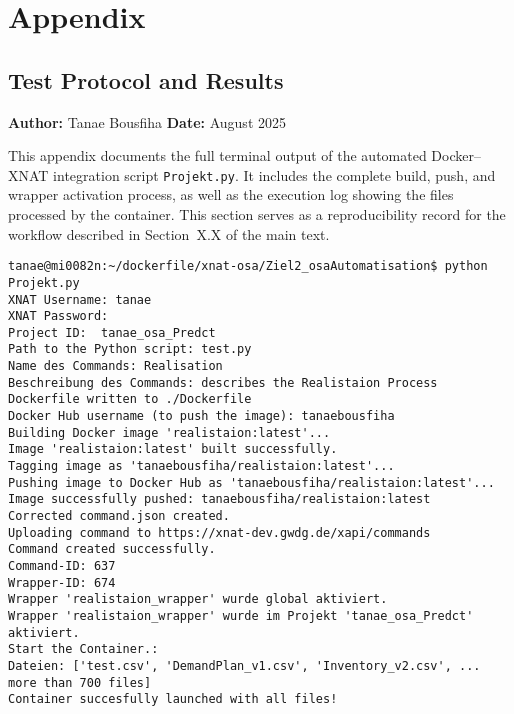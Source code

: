 
    
\appendix
\chapter{Appendix}
\section{Test Protocol and Results}
\label{app:test}

\noindent\textbf{Author:} Tanae Bousfiha  
\noindent\textbf{Date:} August 2025  

\noindent This appendix documents the full terminal output of the automated Docker–XNAT integration script
\texttt{Projekt.py}.  
It includes the complete build, push, and wrapper activation process, as well as the execution log showing the files processed by the container.  
This section serves as a reproducibility record for the workflow described in Section~X.X of the main text.

\begin{lstlisting}
tanae@mi0082n:~/dockerfile/xnat-osa/Ziel2_osaAutomatisation$ python Projekt.py
XNAT Username: tanae
XNAT Password:
Project ID:  tanae_osa_Predct
Path to the Python script: test.py
Name des Commands: Realisation
Beschreibung des Commands: describes the Realistaion Process
Dockerfile written to ./Dockerfile
Docker Hub username (to push the image): tanaebousfiha
Building Docker image 'realistaion:latest'...
Image 'realistaion:latest' built successfully.
Tagging image as 'tanaebousfiha/realistaion:latest'...
Pushing image to Docker Hub as 'tanaebousfiha/realistaion:latest'...
Image successfully pushed: tanaebousfiha/realistaion:latest
Corrected command.json created.
Uploading command to https://xnat-dev.gwdg.de/xapi/commands
Command created successfully.
Command-ID: 637
Wrapper-ID: 674
Wrapper 'realistaion_wrapper' wurde global aktiviert.
Wrapper 'realistaion_wrapper' wurde im Projekt 'tanae_osa_Predct' aktiviert.
Start the Container.:
Dateien: ['test.csv', 'DemandPlan_v1.csv', 'Inventory_v2.csv', ... more than 700 files]
Container succesfully launched with all files!
\end{lstlisting}

